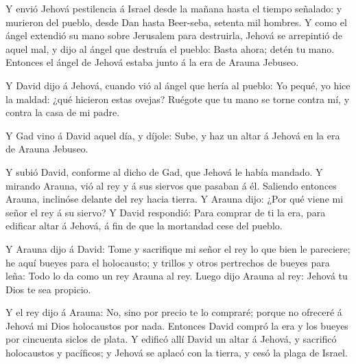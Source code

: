  Y envió Jehová pestilencia á Israel desde la mañana hasta
el tiempo señalado: y murieron del pueblo, desde Dan hasta Beer-seba,
setenta mil hombres.  Y como el ángel extendió su mano
sobre Jerusalem para destruirla, Jehová se arrepintió de aquel mal, y
dijo al ángel que destruía el pueblo: Basta ahora; detén tu mano.
Entonces el ángel de Jehová estaba junto á la era de Arauna Jebuseo.

 Y David dijo á Jehová, cuando vió al ángel que hería al
pueblo: Yo pequé, yo hice la maldad: ¿qué hicieron estas ovejas? Ruégote
que tu mano se torne contra mí, y contra la casa de mi padre.

 Y Gad vino á David aquel día, y díjole: Sube, y haz un
altar á Jehová en la era de Arauna Jebuseo.

 Y subió David, conforme al dicho de Gad, que Jehová le
había mandado.  Y mirando Arauna, vió al rey y á sus
siervos que pasaban á él. Saliendo entonces Arauna, inclinóse delante
del rey hacia tierra.  Y Arauna dijo: ¿Por qué viene mi
señor el rey á su siervo? Y David respondió: Para comprar de ti la era,
para edificar altar á Jehová, á fin de que la mortandad cese del pueblo.

 Y Arauna dijo á David: Tome y sacrifique mi señor el rey
lo que bien le pareciere; he aquí bueyes para el holocausto; y trillos y
otros pertrechos de bueyes para leña:  Todo lo da como un
rey Arauna al rey. Luego dijo Arauna al rey: Jehová tu Dios te sea
propicio.

 Y el rey dijo á Arauna: No, sino por precio te lo
compraré; porque no ofreceré á Jehová mi Dios holocaustos por nada.
Entonces David compró la era y los bueyes por cincuenta siclos de plata.
 Y edificó allí David un altar á Jehová, y sacrificó
holocaustos y pacíficos; y Jehová se aplacó con la tierra, y cesó la
plaga de Israel.
